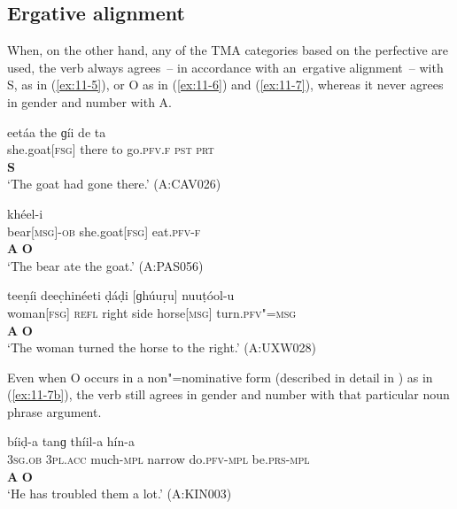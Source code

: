 \subsection{Ergative alignment}
\label{subsec:11-1-2}


When, on the other hand, any of the TMA categories based on the perfective are used, the verb always agrees~-- in accordance with an~ergative alignment~-- with S, as in (\ref{ex:11-5}), or O as in (\ref{ex:11-6}) and (\ref{ex:11-7}), whereas it never agrees in gender and number with A.

\begin{exe}
\ex
\label{ex:11-5}
\glll [čhéeli] eetáa the ɡíi de ta \\
she.goat[\textsc{fsg}] there to go.\textsc{pfv.}\textsc{f} \textsc{pst} \textsc{prt} \\
 \textbf{S} \\
\glt `The goat had gone there.' (A:CAV026)

\ex
\label{ex:11-6}
\glll [ínc̣-a] [čhéeli] khéel-i \\
bear[\textsc{msg}]-\textsc{ob} she.goat[\textsc{fsg}] eat.\textsc{pfv-}\textsc{f} \\
\textbf{A} \textbf{O} \\
\glt `The bear ate the goat.' (A:PAS056)

\ex
\label{ex:11-7}
\glll [kúṛi] teeṇíi deec̣hinéeti ḍáḍi [ɡhúuṛu] nuuṭóol-u \\
woman[\textsc{fsg}] \textsc{refl} right side horse[\textsc{msg}] turn.\textsc{pfv"=msg} \\
\textbf{A} {} {} {}  \textbf{O} \\
\glt `The woman turned the horse to the right.' (A:UXW028)
\end{exe}


Even when O occurs in a non"=nominative form (described in detail in ) as in (\ref{ex:11-7b}), the verb still agrees in gender and number with that particular noun phrase argument.

\begin{exe}
\ex
\label{ex:11-7b}
\glll [tíi] [tanaám] bíiḍ-a tanɡ thíil-a hín-a \\
\textsc{3sg.ob} \textsc{3pl.acc} much-\textsc{mpl} narrow do.\textsc{pfv}-\textsc{mpl} be.\textsc{prs}-\textsc{mpl} \\
\textbf{A} \textbf{O} \\
\glt `He has troubled them a lot.' (A:KIN003)
\end{exe}


